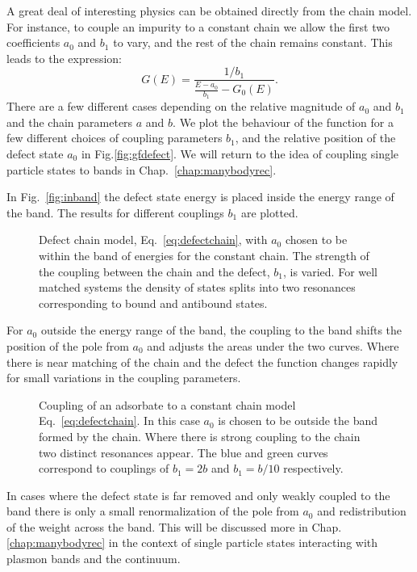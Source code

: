 A great deal of interesting physics can be obtained directly from the chain model. 
For instance, to couple an impurity to a constant chain we allow the first two coefficients $a_{0}$ and $b_{1}$ to vary, 
and the rest of the chain remains constant. This leads to the expression:
%
\begin{equation}
\label{eq:defectchain}
G(E) = \frac{1/b_{1}}{\frac{E-a_{0}}{b_{1}} - G_{0}(E)}.
\end{equation}
%
There are a few different cases depending on the relative magnitude of $a_0$ 
and $b_{1}$ and the chain parameters $a$ and $b$.
We plot the behaviour of the function for a few different choices of coupling parameters
$b_{1}$, and the relative position of the defect state $a_0$ in Fig.\ref{fig:gfdefect}. 
We will return to the idea of coupling single particle states to bands in Chap.~\ref{chap:manybodyrec}. 

In Fig.~\ref{fig:inband} the defect state energy is placed inside the energy range of the band. The
results for different couplings $b_{1}$ are plotted.
%
\begin{figure}
\begin{center}
{\graphicspath{{./invariance/chain_figs/}}}
\caption{Defect chain model, Eq.~\ref{eq:defectchain}, with $a_{0}$ chosen to be 
within the band of energies for the constant chain. The strength of the coupling between the chain 
and the defect, $b_1$, is varied. For well matched systems the density of states splits 
into two resonances corresponding to bound and antibound states. \label{fig:impurity}}
\end{center}
\end{figure}
%

For $a_{0}$ outside the energy range of the band, the coupling to the band shifts the position
of the pole from $a_{0}$ and adjusts the areas under the two curves. Where there is 
near matching of the chain and the defect the function changes rapidly for small
variations in the coupling parameters.
%
\begin{figure}
\begin{center}
{\graphicspath{{./invariance/chain_figs/}}}
\caption{Coupling of an adsorbate to a constant chain model Eq.~\ref{eq:defectchain}. 
In this case $a_{0}$ is chosen to be outside the band formed by the chain.
Where there is strong coupling to the chain two distinct resonances appear.
The blue and green curves correspond to couplings of $b_{1}=2b$ and $b_{1}=b/10$ respectively.
\label{fig:gfconstchain}}
\end{center}
\end{figure}
%
In cases where the defect state is far removed and only weakly coupled to the band
there is only a small renormalization of the pole from $a_{0}$ and redistribution of the weight across the band.
This will be discussed more in Chap.\ref{chap:manybodyrec} in the context of single particle states
interacting with plasmon bands and the continuum.

